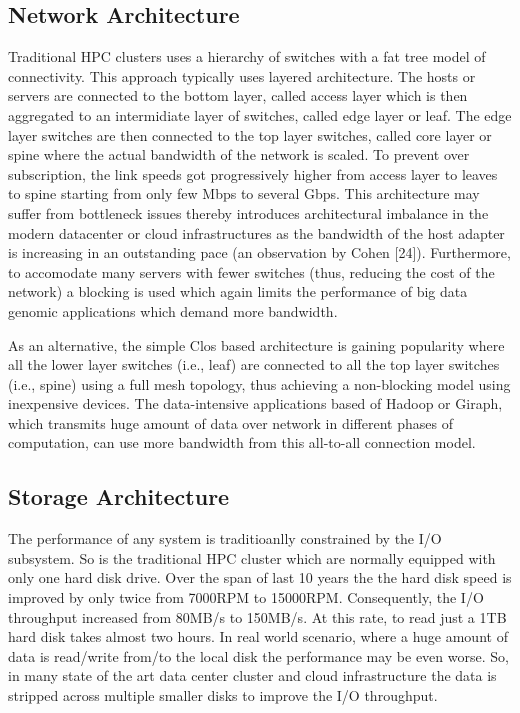 \documentclass[journal]{IEEEtran}
\begin{document}
\subsection{Network Architecture}
Traditional HPC clusters uses a hierarchy of switches with
a fat tree model of connectivity. This approach typically uses
layered architecture. The hosts or servers are connected to the
bottom layer, called access layer which is then aggregated to
an intermidiate layer of switches, called edge layer or leaf. The edge layer switches are then connected to the top layer switches, called core layer or spine where the actual bandwidth of the network is scaled. To prevent over subscription, the link speeds got progressively higher from access layer to leaves to spine starting from only few Mbps to several Gbps. This architecture may suffer from bottleneck issues thereby introduces architectural imbalance in the modern datacenter or cloud infrastructures as the bandwidth of the host adapter is increasing in an outstanding pace (an observation by Cohen [24]). Furthermore, to accomodate many servers with fewer switches (thus, reducing the cost of the network) a blocking is used which again limits the performance of big data genomic applications which demand more bandwidth.

As an alternative, the simple Clos based architecture is gaining
popularity where all the lower layer switches (i.e., leaf)
are connected to all the top layer switches (i.e., spine) using
a full mesh topology, thus achieving a non-blocking model using
inexpensive devices. The data-intensive applications based
of Hadoop or Giraph, which transmits huge amount of data over
network in different phases of computation, can use more bandwidth from this all-to-all connection model.

\subsection{Storage Architecture}
The performance of any system is traditioanlly constrained
by the I/O subsystem. So is the traditional HPC cluster which
are normally equipped with only one hard disk drive. Over the
span of last 10 years the the hard disk speed is improved by
only twice from 7000RPM to 15000RPM. Consequently, the
I/O throughput increased from 80MB/s to 150MB/s. At this
rate, to read just a 1TB hard disk takes almost two hours. In
real world scenario, where a huge amount of data is read/write
from/to the local disk the performance may be even worse. So,
in many state of the art data center cluster and cloud infrastructure the data is stripped across multiple smaller disks to improve the I/O throughput.
\end{document}
